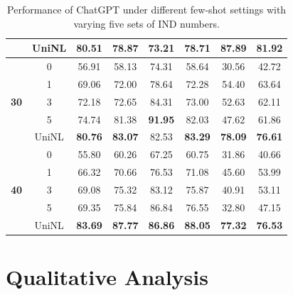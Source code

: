 \documentclass[10pt, a4paper]{article}
\begin{document}
\begin{table}
{\begin{tabular}{c|c|cc|cc|cc}
                             &UniNL &\textbf{80.51}	&78.87	&73.21	&78.71	&\textbf{87.89}	&\textbf{81.92}\\ \hline
\multirow{5}{*}{\textbf{30}} & 0 & 56.91 & 58.13 & 74.31 & 58.64 & 30.56 & 42.72 \\
                             & 1 & 69.06 & 72.00 & 78.64 & 72.28 & 54.40 & 63.64 \\
                             & 3 & 72.18 & 72.65 & 84.31 & 73.00 & 52.63 & 62.11 \\
                             & 5 & 74.74 & 81.38 & \textbf{91.95} & 82.03 & 47.62 & 61.86 \\ \cline{2-8}
                             &UniNL & \textbf{80.76}	&\textbf{83.07}	&82.53	&\textbf{83.29}	&\textbf{78.09}	&\textbf{76.61}\\ \hline
\multirow{5}{*}{\textbf{40}} & 0 & 55.80 & 60.26 & 67.25 & 60.75 & 31.86 & 40.66 \\
                             & 1 & 66.32 & 70.66 & 76.53 & 71.08 & 45.60 & 53.99 \\
                             & 3 & 69.08 & 75.32 & 83.12 & 75.87 & 40.91 & 53.11 \\
                             & 5 & 69.35 & 75.84 & 86.84 & 76.55 & 32.80 & 47.15 \\ \cline{2-8} 
                             &UniNL & \textbf{83.69}	&\textbf{87.77}	&\textbf{86.86}	&\textbf{88.05}	&\textbf{77.32}	&\textbf{76.53}\\ \hline
\end{tabular}%
}
\caption{Performance of ChatGPT under different few-shot settings with varying five sets of IND numbers.}
\label{tab:num_few_shot}
\end{table}

\section{Qualitative Analysis}
\label{sec:qualitative}
\end{document}
